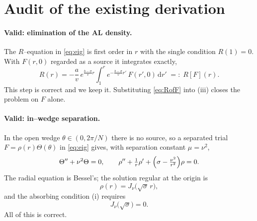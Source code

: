 \documentclass{article}
\newcommand{\rd}{\mathrm{d}}
\begin{document}
\section{Audit of the existing derivation}

\paragraph{Valid: elimination of the AL density.} The $R$--equation in
\eqref{eq:eig} is first order in $r$ with the single condition $R(1)=0$. With
$F(r,0)$ regarded as a source it integrates exactly,
\begin{equation}
R(r)=-\frac{a}{v}\,e^{\frac{b-\sigma}{v}r}
\int_{1}^{r} e^{-\frac{b-\sigma}{v}r'}\,F(r',0)\,\rd r'
\;=:\;R[F](r).
\label{eq:RofF}
\end{equation}
This step is correct and we keep it. Substituting \eqref{eq:RofF} into (iii)
closes the problem on $F$ alone.

\paragraph{Valid: in--wedge separation.} In the open wedge
$\theta\in(0,2\pi/N)$ there is no source, so a separated trial
$F=\rho(r)\Theta(\theta)$ in \eqref{eq:eig} gives, with separation constant
$\mu=\nu^{2}$,
\begin{equation}
\Theta''+\nu^{2}\Theta=0,
\qquad
\rho''+\tfrac1r\rho'+\Bigl(\sigma-\tfrac{\nu^{2}}{r^{2}}\Bigr)\rho=0 .
\label{eq:sep}
\end{equation}
The radial equation is Bessel's; the solution regular at the origin is
\begin{equation}
\rho(r)=J_{\nu}\!\bigl(\sqrt{\sigma}\,r\bigr),
\label{eq:rho}
\end{equation}
and the absorbing condition (i) requires
\begin{equation}
J_{\nu}\!\bigl(\sqrt{\sigma}\bigr)=0 .
\label{eq:dirichlet}
\end{equation}
All of this is correct.
\end{document}
